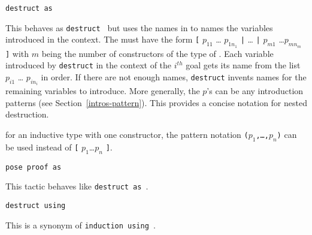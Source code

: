 
\begin{Variants}
\item{\tt destruct {\term} as {\intropattern}}
  
  This behaves as {\tt destruct {\term}} but uses the names in
  {\intropattern} to names the variables introduced in the context.
  The {\intropattern} must have the form {\tt [} $p_{11}$ \ldots
  $p_{1n_1}$ {\tt |} {\ldots} {\tt |} $p_{m1}$ \ldots $p_{mn_m}$ {\tt
    ]} with $m$ being the number of constructors of the type of
  {\term}. Each variable introduced by {\tt destruct} in the context
  of the $i^{th}$ goal gets its name from the list $p_{i1}$ \ldots
  $p_{in_i}$ in order. If there are not enough names, {\tt destruct}
  invents names for the remaining variables to introduce. More
  generally, the $p$'s can be any introduction patterns (see
  Section~\ref{intros-pattern}). This provides a concise notation for
  nested destruction.


\Rem for an inductive type with one constructor, the pattern notation
{\tt ($p_{1}$,\ldots,$p_{n}$)} can be used instead of
{\tt [} $p_{1} $\ldots $p_{n}$ {\tt ]}.

\item \texttt{pose proof {\term} as {\intropattern}}

  This tactic behaves like \texttt{destruct {\term} as {\intropattern}}.

\item{\tt destruct {\term} using {\qualid}}

  This is a synonym of {\tt induction {\term} using {\qualid}}.


\end{Variants}
